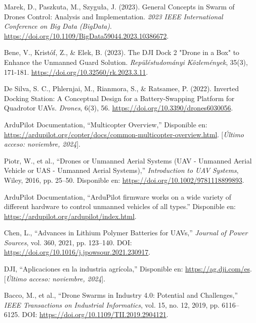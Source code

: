 
\begin{thebibliography}{30}

     Marek, D., Paszkuta, M., Szyguła, J. (2023). General Concepts in Swarm of Drones Control: Analysis and Implementation. \textit{2023 IEEE International Conference on Big Data (BigData)}. \url{https://doi.org/10.1109/BigData59044.2023.10386672}.
  
     Bene, V., Kristóf, Z., \& Elek, B. (2023). The DJI Dock 2 "Drone in a Box" to Enhance the Unmanned Guard Solution. \textit{Repüléstudományi Közlemények}, 35(3), 171-181. \url{https://doi.org/10.32560/rk.2023.3.11}.
   
     De Silva, S. C., Phlernjai, M., Rianmora, S., \& Ratsamee, P. (2022). Inverted Docking Station: A Conceptual Design for a Battery-Swapping Platform for Quadrotor UAVs. \textit{Drones}, 6(3), 56. \url{https://doi.org/10.3390/drones6030056}.

    ArduPilot Documentation, ``Multicopter Overview,'' Disponible en: \url{https://ardupilot.org/copter/docs/common-multicopter-overview.html}. [\textit{Último acceso: noviembre, 2024}].


    
    Piotr, W., et al., ``Drones or Unmanned Aerial Systems (UAV - Unmanned Aerial Vehicle or UAS - Unmanned Aerial Systems),'' \textit{Introduction to UAV Systems}, Wiley, 2016, pp. 25--50. Disponible en: \url{https://doi.org/10.1002/9781118899893}.

    



     ArduPilot Documentation, ``ArduPilot firmware works on a wide variety of different hardware to control unmanned vehicles of all types.'' Disponible en: \url{https://ardupilot.org/ardupilot/index.html}.


    Chen, L., ``Advances in Lithium Polymer Batteries for UAVs,'' \textit{Journal of Power Sources}, vol. 360, 2021, pp. 123--140. DOI: \url{https://doi.org/10.1016/j.jpowsour.2021.230917}.




    DJI, ``Aplicaciones en la industria agrícola,'' Disponible en: \url{https://ag.dji.com/es}. [\textit{Último acceso: noviembre, 2024}].

    Bacco, M., et al., ``Drone Swarms in Industry 4.0: Potential and Challenges,'' \textit{IEEE Transactions on Industrial Informatics}, vol. 15, no. 12, 2019, pp. 6116--6125. DOI: \url{https://doi.org/10.1109/TII.2019.2904121}.



\end{thebibliography}
